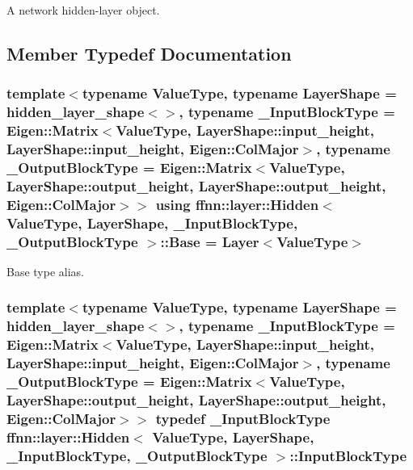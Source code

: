 A network hidden-\/layer object. 

\subsection{Member Typedef Documentation}
\hypertarget{classffnn_1_1layer_1_1_hidden_a2ff8a0b925b2b929b05e7889dda361e4}{
\subsubsection[{Base}]{\setlength{\rightskip}{0pt plus 5cm}template$<$typename Value\-Type, typename Layer\-Shape = hidden\-\_\-layer\-\_\-shape$<$$>$, typename \-\_\-\-Input\-Block\-Type = Eigen\-::\-Matrix$<$\-Value\-Type, Layer\-Shape\-::input\-\_\-height, Layer\-Shape\-::input\-\_\-height, Eigen\-::\-Col\-Major$>$, typename \-\_\-\-Output\-Block\-Type = Eigen\-::\-Matrix$<$\-Value\-Type, Layer\-Shape\-::output\-\_\-height, Layer\-Shape\-::output\-\_\-height, Eigen\-::\-Col\-Major$>$$>$ using {\bf ffnn\-::layer\-::\-Hidden}$<$ Value\-Type, Layer\-Shape, \-\_\-\-Input\-Block\-Type, \-\_\-\-Output\-Block\-Type $>$\-::{\bf Base} =  {\bf Layer}$<$Value\-Type$>$}}\label{classffnn_1_1layer_1_1_hidden_a2ff8a0b925b2b929b05e7889dda361e4}


Base type alias. 

\hypertarget{classffnn_1_1layer_1_1_hidden_ae401b1af7763caf09a0dffcaf4f2d5e9}{
\subsubsection[{Input\-Block\-Type}]{\setlength{\rightskip}{0pt plus 5cm}template$<$typename Value\-Type, typename Layer\-Shape = hidden\-\_\-layer\-\_\-shape$<$$>$, typename \-\_\-\-Input\-Block\-Type = Eigen\-::\-Matrix$<$\-Value\-Type, Layer\-Shape\-::input\-\_\-height, Layer\-Shape\-::input\-\_\-height, Eigen\-::\-Col\-Major$>$, typename \-\_\-\-Output\-Block\-Type = Eigen\-::\-Matrix$<$\-Value\-Type, Layer\-Shape\-::output\-\_\-height, Layer\-Shape\-::output\-\_\-height, Eigen\-::\-Col\-Major$>$$>$ typedef \-\_\-\-Input\-Block\-Type {\bf ffnn\-::layer\-::\-Hidden}$<$ Value\-Type, Layer\-Shape, \-\_\-\-Input\-Block\-Type, \-\_\-\-Output\-Block\-Type $>$\-::{\bf Input\-Block\-Type}}}\label{classffnn_1_1layer_1_1_hidden_ae401b1af7763caf09a0dffcaf4f2d5e9}


